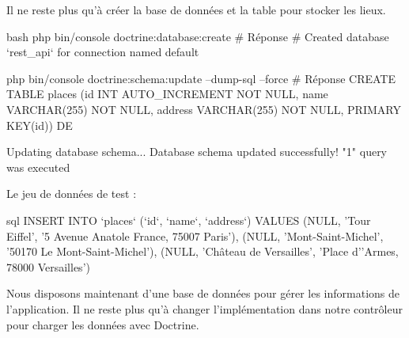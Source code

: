 \documentclass[big]{zmdocument}
\begin{document}
Il ne reste plus qu'à créer la base de données et la table pour stocker les lieux.



\begin{CodeBlock}{bash}
php bin/console doctrine:database:create
# Réponse
# Created database `rest_api` for connection named default

php bin/console doctrine:schema:update --dump-sql --force
# Réponse
CREATE TABLE places (id INT AUTO_INCREMENT NOT NULL, name VARCHAR(255) NOT NULL, address VARCHAR(255) NOT NULL, PRIMARY KEY(id)) DE

Updating database schema...
Database schema updated successfully! "1" query was executed
\end{CodeBlock}



Le jeu de données de test :



\begin{CodeBlock}{sql}
INSERT INTO `places` (`id`, `name`, `address`) VALUES (NULL, 'Tour Eiffel', '5 Avenue Anatole France, 75007 Paris'), (NULL, 'Mont-Saint-Michel', '50170 Le Mont-Saint-Michel'), (NULL, 'Château de Versailles', 'Place d''Armes, 78000 Versailles')
\end{CodeBlock}



Nous disposons maintenant d'une base de données pour gérer les informations de l'application. Il ne reste plus qu'à changer l'implémentation dans notre contrôleur pour charger les données avec Doctrine.



\end{document}
